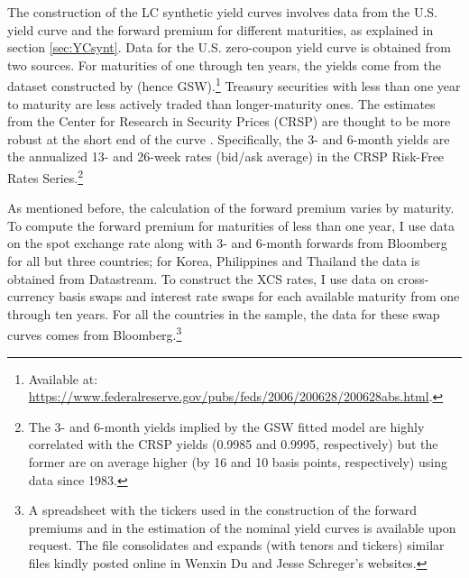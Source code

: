 {The construction of the LC synthetic yield curves involves data from the U.S. yield curve and the forward premium for different maturities, as explained in section \ref{sec:YCsynt}. 
Data for the U.S. zero-coupon yield curve is obtained from two sources. 
For maturities of one through ten years, the yields come from the dataset constructed by \cite*{GSW:2007} (hence GSW).\footnote{Available at: \url{https://www.federalreserve.gov/pubs/feds/2006/200628/200628abs.html}.} 
Treasury securities with less than one year to maturity are less actively traded than longer-maturity ones. 
The estimates from the Center for Research in Security Prices (CRSP) are thought to be more robust at the short end of the curve \citep{Duffee:2010}.
Specifically, the 3- and 6-month yields are the annualized 13- and 26-week rates (bid/ask average) in the CRSP Risk-Free Rates Series.\footnote{ The 3- and 6-month yields implied by the GSW fitted model are highly correlated with the CRSP yields (0.9985 and 0.9995, respectively) but the former are on average higher (by 16 and 10 basis points, respectively) using data since 1983.} 

As mentioned before, the calculation of the forward premium varies by maturity.
To compute the forward premium for maturities of less than one year, I use data on the spot exchange rate along with 3- and 6-month forwards from Bloomberg for all but three countries; for Korea, Philippines and Thailand the data is obtained from Datastream.
To construct the XCS rates, I use data on cross-currency basis swaps and interest rate swaps for each available maturity from one through ten years. 
For all the countries in the sample, the data for these swap curves comes from Bloomberg.\footnote{A spreadsheet with the tickers used in the construction of the forward premiums and in the estimation of the nominal yield curves is available upon request. The file consolidates and expands (with tenors and tickers) similar files kindly posted online in Wenxin Du and Jesse Schreger's websites.}

}
